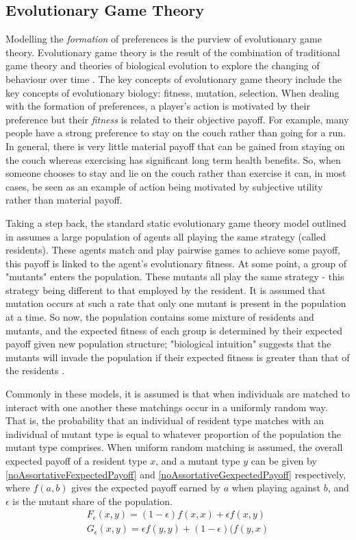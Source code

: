 \documentclass[11pt]{book}
\newcommand*{\np}{\par\noindent\newline}
\begin{document}
\subsection{Evolutionary Game Theory}\label{evo_games}
Modelling the \textit{formation} of preferences is the purview of evolutionary game theory. 
Evolutionary game theory is the result of the combination of traditional game theory and theories of biological evolution to explore the changing of behaviour over time \citep{tanimoto_fundamentals_2015}. 
The key concepts of evolutionary game theory include the key concepts of evolutionary biology: fitness, mutation, selection. 
When dealing with the formation of preferences, a player's action is motivated by their preference but their \textit{fitness} is related to their objective payoff. 
For example, many people have a strong preference to stay on the couch rather than going for a run. 
In general, there is very little material payoff that can be gained from staying on the couch whereas exercising has significant long term health benefits. 
So, when someone chooses to stay and lie on the couch rather than exercise it can, in most cases, be seen as an example of action being motivated by subjective utility rather than material payoff.

\np Taking a step back, the standard static evolutionary game theory model outlined in \citet{weibull_introduction_1992}
assumes a large population of agents all playing the same strategy (called residents). These agents match and play
pairwise games to achieve some payoff, this payoff is linked to the agent's evolutionary fitness. At some point, a group
of "mutants" enters the population. These mutants all play the same strategy - this strategy being different to that
employed by the resident. It is assumed that mutation occurs at such a rate that only one mutant is present in the
population at a time. So now, the population contains some mixture of residents and mutants, and the expected fitness of
each group is determined by their expected payoff given new population structure; "biological intuition" suggests that
the mutants will invade the population if their expected fitness is greater than that of the residents \citep[~p. 9]{weibull_introduction_1992}.

\np Commonly in these models, it is assumed is that when individuals are matched to interact with one another these matchings occur in a uniformly random way.
That is, the probability that an individual of resident type matches with an individual of mutant type is equal to whatever proportion of the population the mutant type comprises.
When uniform random matching is assumed, the overall expected payoff of a resident type $x$, and a mutant type $y$ can be given by \ref{noAssortativeFexpectedPayoff} and \ref{noAssortativeGexpectedPayoff} respectively,
where $f(a,b)$ gives the expected payoff earned by $a$ when playing against $b$, and $\epsilon$ is the mutant share of the population.
\begin{gather}
	\label{noAssortativeFexpectedPayoff}
	F_{\epsilon}(x, y) = (1-\epsilon)f(x, x) + \epsilon f(x, y)\\
	\label{noAssortativeGexpectedPayoff}
	G_{\epsilon}(x, y) = \epsilon f(y, y) + (1-\epsilon)(f(y, x)
\end{gather}
\end{document}

